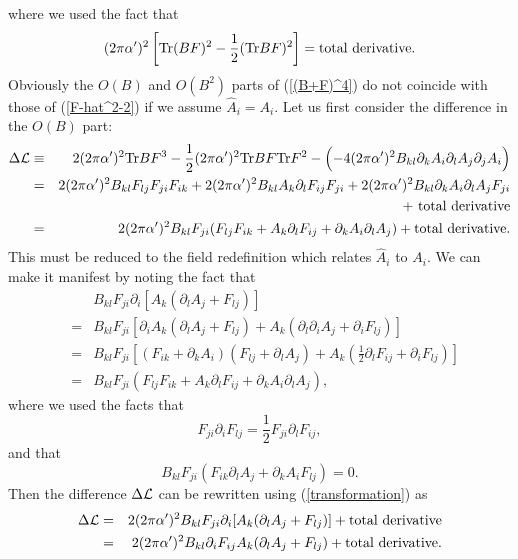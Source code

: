 \documentclass[a4paper,12pt]{article}
\begin{document}
where we used the fact that
\begin{equation}
(2 \pi \alpha')^2 \left[
{\rm Tr} ( B F )^2
- \frac{1}{2} ( {\rm Tr} B F )^2
\right] = {\rm total~derivative}.
\end{equation}
Obviously the $O(B)$ and $O(B^2)$ parts of (\ref{(B+F)^4})
do not coincide with those of (\ref{F-hat^2-2})
if we assume $\hat{A}_i=A_i$.
Let us first consider
the difference in the $O(B)$ part:
\begin{eqnarray}
\Delta {\cal L} &\equiv&
2 (2 \pi \alpha')^2 {\rm Tr} BF^3
-\frac{1}{2} (2 \pi \alpha')^2 {\rm Tr} BF {\rm Tr} F^2
- \Bigl( -4 (2 \pi \alpha')^2 B_{kl}
\partial_k A_i \partial_l A_j \partial_j A_i \Bigr)
\nonumber \\
&=& 2 (2 \pi \alpha')^2 B_{kl} F_{lj} F_{ji} F_{ik}
+2 (2 \pi \alpha')^2 B_{kl} A_k \partial_l F_{ij} F_{ji}
+2 (2 \pi \alpha')^2 B_{kl} \partial_k A_i \partial_l A_j F_{ji}
\nonumber \\
&& + {\rm ~total~derivative}
\nonumber \\
&=& 2 (2 \pi \alpha')^2 B_{kl} F_{ji}
( F_{lj} F_{ik} + A_k \partial_l F_{ij}
+ \partial_k A_i \partial_l A_j )
+ {\rm total~derivative}.
\end{eqnarray}
This must be reduced to the field redefinition
which relates $\hat{A}_i$ to $A_i$.
We can make it manifest by noting the fact that
\begin{eqnarray}
&& B_{kl} F_{ji} \partial_i [
A_k (\partial_l A_j + F_{lj})]
\nonumber \\
&=& B_{kl} F_{ji} [
\partial_i A_k (\partial_l A_j + F_{lj})
+ A_k (\partial_l \partial_i A_j + \partial_i F_{lj})]
\nonumber \\
&=& B_{kl} F_{ji} \left[
(F_{ik} + \partial_k A_i) (F_{lj} + \partial_l A_j)
+ A_k \left( \frac{1}{2} \partial_l F_{ij} + \partial_i F_{lj}
\right) \right]
\nonumber \\
&=& B_{kl} F_{ji} ( F_{lj} F_{ik} + A_k \partial_l F_{ij}
+ \partial_k A_i \partial_l A_j ),
\label{transformation}
\end{eqnarray}
where we used the facts that
\begin{equation}
F_{ji} \partial_i F_{lj} = \frac{1}{2} F_{ji} \partial_l F_{ij},
\end{equation}
and that
\begin{equation}
B_{kl} F_{ji} (F_{ik} \partial_l A_j + \partial_k A_i F_{lj}) =0.
\end{equation}
Then the difference $\Delta {\cal L}$ can be rewritten
using (\ref{transformation}) as
\begin{eqnarray}
\Delta {\cal L} &=&
2 (2 \pi \alpha')^2 B_{kl} F_{ji}
\partial_i [ A_k (\partial_l A_j + F_{lj})]
+ {\rm total~derivative}
\nonumber \\
&=& 2 (2 \pi \alpha')^2 B_{kl} \partial_i F_{ij}
A_k (\partial_l A_j + F_{lj})
+ {\rm total~derivative}.
\end{eqnarray}
\end{document}
